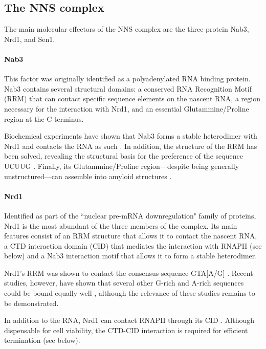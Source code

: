 \subsection{The NNS complex}

The main molecular effectors of the NNS complex are the three protein Nab3, Nrd1, and Sen1.


\paragraph{Nab3}

This factor was originally identified as a polyadenylated RNA binding protein. 
Nab3 contains several structural domains: a conserved RNA Recognition Motif (RRM) that can contact specific sequence elements on the nascent RNA, a region necessary for the interaction with Nrd1, and an essential Glutammine/Proline region at the C-terminus.

Biochemical experiments have shown that Nab3 forms a stable heterodimer with Nrd1 and contacts the RNA as such \cite{conrad:2000:yeast}. 
In addition, the structure of the RRM has been solved, revealing the structural basis for the preference of the sequence UCUUG \cite{lunde:2011:structural}. 
Finally, its Glutammine/Proline region---despite being generally unstructured---can assemble into amyloid structures \cite{orourke:2015:amyloidlike}.


\paragraph{Nrd1}

Identified as part of the ``nuclear pre-mRNA downregulation" family of proteins, Nrd1 is the most abundant of the three members of the complex. 
Its main features consist of an RRM structure that allows it to contact the nascent RNA, a CTD interaction domain (CID) that mediates the interaction with RNAPII (see below) and a Nab3 interaction motif that allows it to form a stable heterodimer.

Nrd1's RRM was shown \invivo{} to contact the consensus sequence GTA[A/G] \cite{steinmetz:1998:control}. 
Recent \invitro{} studies, however, have shown that several other G-rich and A-rich sequences could be bound equally well \citep{bacikova:2014:structure}, although the \invivo{} relevance of these studies remains to be demonstrated. 

In addition to the RNA, Nrd1 can contact RNAPII through its CID \cite{kubicek:2012:serine,vasiljeva:2008:nrd1nab3sen1}. 
Although dispensable for cell viability, the CTD-CID interaction is required for efficient termination (see below).


